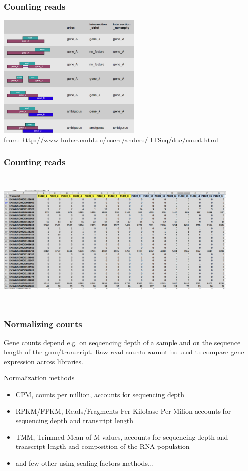 \documentclass{beamer}\usepackage[]{graphicx}\usepackage[]{color}
\begin{document}
\begin{frame}
\frametitle{Counting reads}
\centering
\includegraphics[width=7cm]{Images/counts_HTseq.png}
  \\{\tiny{from: http://www-huber.embl.de/users/anders/HTSeq/doc/count.html}}
\end{frame}

\begin{frame}
\frametitle{Counting reads}
\begin{center}
\includegraphics[width=12cm, height=7cm]{Images/counts_table.png}
\end{center}
\end{frame}

\begin{frame}
\frametitle{Normalizing counts}
\begin{displayquote}
Gene counts depend e.g. on sequencing depth of a sample and on the sequence length of the gene/transcript. Raw read counts cannot be used to compare gene expression across libraries. 
\end{displayquote}
\begin{block}{Normalization methods}
\begin{itemize}
\item CPM, counts per million, accounts for sequencing depth
\item RPKM/FPKM, Reads/Fragments Per Kilobase Per Milion accounts for sequencing depth and transcript length
\item TMM, Trimmed Mean of M-values, accounts for sequencing depth and transcript length and composition of the RNA population
\item and few other using scaling factors methods...
\end{itemize}
\end{block}
\end{frame}
\end{document}
